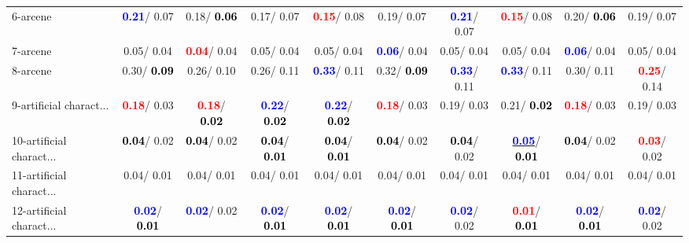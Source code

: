 \begin{table}[h]
\begin{center}
{\begin{tabular}{lc|c|c|c|c|c|c|c|c}
6-arcene & \textcolor{blue}{\textbf{  0.21}}/  0.07 &   0.18/\textcolor{black}{\textbf{  0.06}} &   0.17/  0.07 & \textcolor{red}{\textbf{  0.15}}/  0.08 &   0.19/  0.07 & \textcolor{blue}{\textbf{  0.21}}/  0.07 & \textcolor{red}{\textbf{  0.15}}/  0.08 &   0.20/\textcolor{black}{\textbf{  0.06}} &   0.19/  0.07 \\
7-arcene &   0.05/  0.04 & \textcolor{red}{\textbf{  0.04}}/  0.04 &   0.05/  0.04 &   0.05/  0.04 & \textcolor{blue}{\textbf{  0.06}}/  0.04 &   0.05/  0.04 &   0.05/  0.04 & \textcolor{blue}{\textbf{  0.06}}/  0.04 &   0.05/  0.04 \\ \hline
8-arcene &   0.30/\textcolor{black}{\textbf{  0.09}} &   0.26/  0.10 &   0.26/  0.11 & \textcolor{blue}{\textbf{  0.33}}/  0.11 &   0.32/\textcolor{black}{\textbf{  0.09}} & \textcolor{blue}{\textbf{  0.33}}/  0.11 & \textcolor{blue}{\textbf{  0.33}}/  0.11 &   0.30/  0.11 & \textcolor{red}{\textbf{  0.25}}/  0.14 \\
9-artificial charact... & \textcolor{red}{\textbf{  0.18}}/  0.03 & \textcolor{red}{\textbf{  0.18}}/\textcolor{black}{\textbf{  0.02}} & \textcolor{blue}{\textbf{  0.22}}/\textcolor{black}{\textbf{  0.02}} & \textcolor{blue}{\textbf{  0.22}}/\textcolor{black}{\textbf{  0.02}} & \textcolor{red}{\textbf{  0.18}}/  0.03 &   0.19/  0.03 &   0.21/\textcolor{black}{\textbf{  0.02}} & \textcolor{red}{\textbf{  0.18}}/  0.03 &   0.19/  0.03 \\
10-artificial charact... & \textcolor{black}{\textbf{  0.04}}/  0.02 & \textcolor{black}{\textbf{  0.04}}/  0.02 & \textcolor{black}{\textbf{  0.04}}/\textcolor{black}{\textbf{  0.01}} & \textcolor{black}{\textbf{  0.04}}/\textcolor{black}{\textbf{  0.01}} & \textcolor{black}{\textbf{  0.04}}/  0.02 & \textcolor{black}{\textbf{  0.04}}/  0.02 & \underline{\textcolor{blue}{\textbf{  0.05}}}/\textcolor{black}{\textbf{  0.01}} & \textcolor{black}{\textbf{  0.04}}/  0.02 & \textcolor{red}{\textbf{  0.03}}/  0.02 \\
11-artificial charact... &   0.04/  0.01 &   0.04/  0.01 &   0.04/  0.01 &   0.04/  0.01 &   0.04/  0.01 &   0.04/  0.01 &   0.04/  0.01 &   0.04/  0.01 &   0.04/  0.01 \\
12-artificial charact... & \textcolor{blue}{\textbf{  0.02}}/\textcolor{black}{\textbf{  0.01}} & \textcolor{blue}{\textbf{  0.02}}/  0.02 & \textcolor{blue}{\textbf{  0.02}}/\textcolor{black}{\textbf{  0.01}} & \textcolor{blue}{\textbf{  0.02}}/\textcolor{black}{\textbf{  0.01}} & \textcolor{blue}{\textbf{  0.02}}/\textcolor{black}{\textbf{  0.01}} & \textcolor{blue}{\textbf{  0.02}}/  0.02 & \textcolor{red}{\textbf{  0.01}}/\textcolor{black}{\textbf{  0.01}} & \textcolor{blue}{\textbf{  0.02}}/\textcolor{black}{\textbf{  0.01}} & \textcolor{blue}{\textbf{  0.02}}/  0.02 \\

\end{tabular}}
\end{center}
\end{table}
